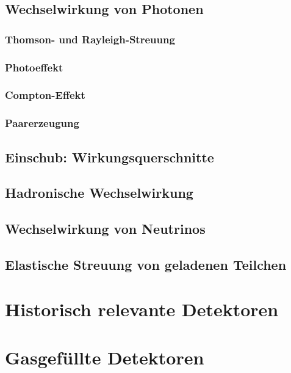 \documentclass{article}
\begin{document}
\graphicspath{{bilder/1-2/}}
	\subsection{Wechselwirkung von Photonen}
		
			\subsubsection{Thomson- und Rayleigh-Streuung}
				
			\subsubsection{Photoeffekt}
				 
			\subsubsection{Compton-Effekt}
				
			\subsubsection{Paarerzeugung}
				
	\subsection{Einschub: Wirkungsquerschnitte}
		
				
\graphicspath{{bilder/1-345/}}
	\subsection{Hadronische Wechselwirkung}
		
	\subsection{Wechselwirkung von Neutrinos}
		
	\subsection{Elastische Streuung von geladenen Teilchen}
		
		
\section{Historisch relevante Detektoren}
\graphicspath{{bilder/2/}}
		
		
		
\section{Gasgefüllte Detektoren}
\graphicspath{{bilder/3-1/}}

\end{document}
